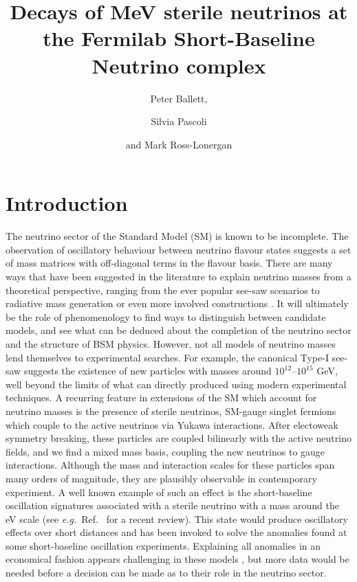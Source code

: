 \documentclass[11pt, a4paper]{article}
\title{Decays of MeV sterile neutrinos at the Fermilab Short-Baseline Neutrino complex}
\author{Peter Ballett,}
\author{Silvia Pascoli}
\author{and Mark Ross-Lonergan}
\affiliation{Institute for Particle Physics Phenomenology, Department of
Physics, Durham University, South Road, Durham DH1 3LE, United Kingdom}
\newcommand{\refref}[1]{Ref.~\cite{#1}}
\def\eg{\emph{e.g.}}
\begin{document}
 

\maketitle

\section{Introduction}

The neutrino sector of the Standard Model (SM) is known to be incomplete. The
observation of oscillatory behaviour between neutrino flavour states suggests a
set of mass matrices with off-diagonal terms in the flavour basis. There are
many ways that have been suggested in the literature to explain neutrino masses
from a theoretical perspective, ranging from the ever popular see-saw scenarios
\cite{Minkowski:1977sc, GellMann:1980vs, Mohapatra:1979ia} to radiative mass
generation \cite{Zee:1980ai,Babu:1988ki} or even more involved constructions
\cite{XXX}. It will ultimately be the role of phenomenology to find ways to
distinguish between candidate models, and see what can be deduced about the
completion of the neutrino sector and the structure of BSM physics.
%
However, not all models of neutrino masses lend themselves to experimental
searches. For example, the canonical Type-I see-saw \cite{Minkowski:1977sc,
GellMann:1980vs, Mohapatra:1979ia} suggests the existence of new particles with
masses around $10^{12}$--$10^{15}$ GeV, well beyond the limits of what can
directly produced using modern experimental techniques. A recurring feature in
extensions of the SM which account for neutrino masses is the presence of
sterile neutrinos, SM-gauge singlet fermions which couple to the active
neutrinos via Yukawa interactions. After electoweak symmetry breaking, these
particles are coupled bilinearly with the active neutrino fields, and we find a
mixed mass basis, coupling the new neutrinos to gauge interactions. Although
the mass and interaction scales for these particles span many orders of
magnitude, they are plausibly observable in contemporary experiment.
%
A well known example of such an effect is the short-baseline oscillation
signatures associated with a sterile neutrino with a mass around the eV scale
(see \eg\ \refref{Gariazzo:2015rra} for a recent review). This state would
produce oscillatory effects over short distances and has been invoked to solve
the anomalies found at some short-baseline oscillation experiments.  Explaining
all anomalies in an economical fashion appears challenging in these models
\cite{Kopp:2013vaa,Conrad:2012qt}, but more data would be needed before a
decision can be made as to their role in the neutrino sector.
\end{document}

